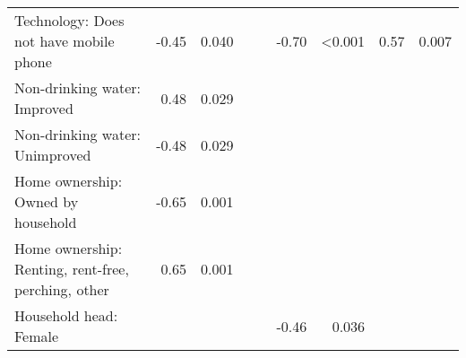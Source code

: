 \begin{tabular}{l r r r r r r r r}
Technology: Does not have mobile phone  &  -0.45  &  0.040  &    &    &  -0.70  &  \textless{}0.001  &  0.57  &  0.007  \\
Non-drinking water: Improved  &  0.48  &  0.029  &    &    &    &    &    &    \\
Non-drinking water: Unimproved  &  -0.48  &  0.029  &    &    &    &    &    &    \\
Home ownership: Owned by household  &  -0.65  &  0.001  &    &    &    &    &    &    \\
Home ownership: Renting, rent-free, perching, other  &  0.65  &  0.001  &    &    &    &    &    &    \\
Household head: Female  &    &    &    &    &  -0.46  &  0.036  &    &    \\
\bottomrule
\end{tabular}
